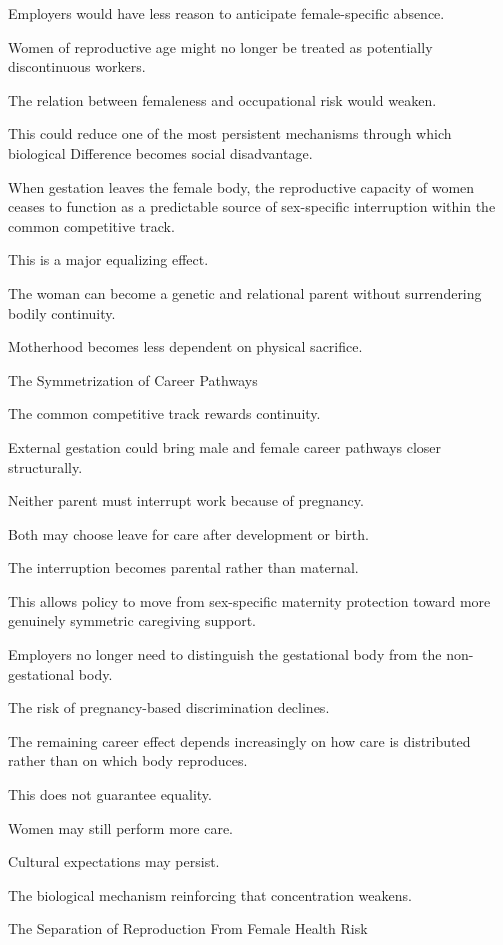 Employers would have less reason to anticipate female-specific absence.

Women of reproductive age might no longer be treated as potentially discontinuous workers.

The relation between femaleness and occupational risk would weaken.

This could reduce one of the most persistent mechanisms through which biological Difference becomes social disadvantage.

When gestation leaves the female body, the reproductive capacity of women ceases to function as a predictable source of sex-specific interruption within the common competitive track.

This is a major equalizing effect.

The woman can become a genetic and relational parent without surrendering bodily continuity.

Motherhood becomes less dependent on physical sacrifice.

The Symmetrization of Career Pathways

The common competitive track rewards continuity.

External gestation could bring male and female career pathways closer structurally.

Neither parent must interrupt work because of pregnancy.

Both may choose leave for care after development or birth.

The interruption becomes parental rather than maternal.

This allows policy to move from sex-specific maternity protection toward more genuinely symmetric caregiving support.

Employers no longer need to distinguish the gestational body from the non-gestational body.

The risk of pregnancy-based discrimination declines.

The remaining career effect depends increasingly on how care is distributed rather than on which body reproduces.

This does not guarantee equality.

Women may still perform more care.

Cultural expectations may persist.

The biological mechanism reinforcing that concentration weakens.

The Separation of Reproduction From Female Health Risk

